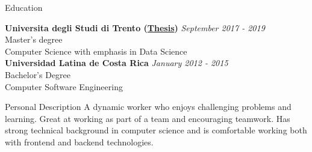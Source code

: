 \documentclass{resume} %
\begin{document}

\begin{rSection}{Education}

{\bf Universita degli Studi di Trento (\href{https://github.com/tupini07/Master-Thesis/tree/master}{Thesis})} \hfill {\em September 2017 - 2019} 
\\ Master's degree \hfill 
\\ Computer Science with emphasis in Data Science \\


{\bf Universidad Latina de Costa Rica} \hfill {\em January 2012 - 2015} 
\\ Bachelor’s Degree \hfill 
\\ Computer Software Engineering 




\end{rSection}


\begin{rSection}{Personal Description}
    A dynamic worker who enjoys challenging problems and learning. Great at working as part of a team and encouraging teamwork. Has strong technical background in computer science and is comfortable working both with frontend and backend technologies.
\end{rSection}

\end{document}
